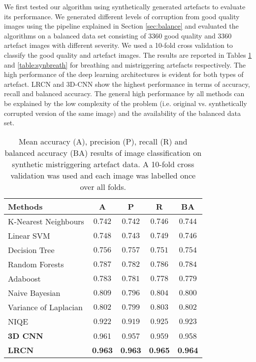 \documentclass[preprint,12pt,authoryear]{elsarticle}
\begin{document}
We first tested our algorithm using synthetically generated artefacts to evaluate its performance. We generated different levels of corruption from good quality images using the pipeline explained in Section \ref{sec:balance} and evaluated the algorithms on a balanced data set consisting of 3360 good quality and 3360 artefact images with different severity. We used a  10-fold cross validation to classify the good quality and artefact images. The results are reported in Tables \ref{table:synmis} and \ref{table:synbreath}  for breathing and mistriggering artefacts respectively.  The high performance of the deep learning architectures is evident for both types of artefact.
LRCN and 3D-CNN show the highest performance in terms of accuracy, recall and balanced accuracy. The general high performance by all methods can be explained by the low complexity of the problem (i.e. original vs. synthetically corrupted version of the same image) and the availability of the balanced data set.


\begin{table}
\centering
\caption{Mean accuracy (A), precision (P), recall (R) and balanced accuracy (BA) results of image classification on synthetic mistriggering artefact data. A 10-fold cross validation was used and each image was labelled once over all folds.}
\begin{tabular}{lcccc}
\hline
Methods    & A & P & R  & BA\\
\hline

K-Nearest Neighbours  & $0.742$  & $0.742$  & $0.746$    & $0.744$     \\
Linear SVM    & $ 0.748 $  & $0.743$  & $0.749$  & $0.746$   \\
Decision Tree   &   $ 0.756 $  & $0.757$  & $0.751$  & $0.754$   \\
Random Forests   & $0.787$    & $0.782$  & $0.786$   & $0.784$  \\
Adaboost   & $0.783 $  & $0.781$  & $0.778$       & $0.779$   \\
Naive Bayesian   & $0.809$  & $0.796$  & $0.804$    & $0.800$     \\
Variance of Laplacian  & $0.802$  & $0.799$ & $0.803$   & $0.802$   \\
NIQE \citep{Mittal2013}  & $0.922$  & $0.919 $& $0.925$  & $0.923$     \\
\hline
\textbf{3D CNN }    & 0.961 & 0.957 & 0.959  & 0.958     \\
\textbf{LRCN }   & \textbf{0.963} &  \textbf{0.963} & \textbf{0.965} &  \textbf{0.964}  \\


\hline
\end{tabular}
\label{table:synmis}
\end{table}
\end{document}
